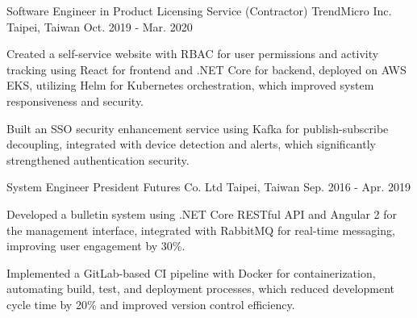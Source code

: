 \begin{cventries}
\cventry
{Software Engineer in Product Licensing Service (Contractor)} %
{TrendMicro Inc.} %
{Taipei, Taiwan} %
{Oct. 2019 - Mar. 2020} %
{
  \begin{cvitems} %
    \item {Created a self-service website with RBAC for user permissions and activity tracking using React for frontend and .NET Core for backend, deployed on AWS EKS, utilizing Helm for Kubernetes orchestration, which improved system responsiveness and security.}
    \item {Built an SSO security enhancement service using Kafka for publish-subscribe decoupling, integrated with device detection and alerts, which significantly strengthened authentication security.}
  \end{cvitems}
}

\cventry
{System Engineer} %
{President Futures Co. Ltd} %
{Taipei, Taiwan} %
{Sep. 2016 - Apr. 2019} %
{
  \begin{cvitems} %
    \item {Developed a bulletin system using .NET Core RESTful API and Angular 2 for the management interface, integrated with RabbitMQ for real-time messaging, improving user engagement by 30\%.}
    \item {Implemented a GitLab-based CI pipeline with Docker for containerization, automating build, test, and deployment processes, which reduced development cycle time by 20\% and improved version control efficiency.}
  \end{cvitems}
}

\end{cventries}
